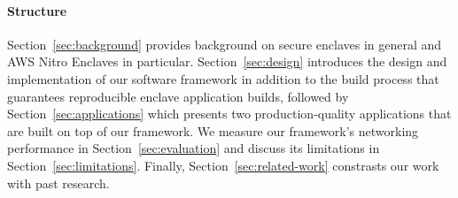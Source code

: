 \paragraph{Structure}

Section~\ref{sec:background} provides background on secure enclaves in general
and AWS Nitro Enclaves in particular.  Section~\ref{sec:design} introduces the
design and implementation of our software framework in addition to the build
process that guarantees reproducible enclave application builds, followed by
Section~\ref{sec:applications} which presents two production-quality
applications that are built on top of our framework.  We measure our framework's
networking performance in Section~\ref{sec:evaluation} and discuss its
limitations in Section~\ref{sec:limitations}.  Finally,
Section~\ref{sec:related-work} constrasts our work with past research.
